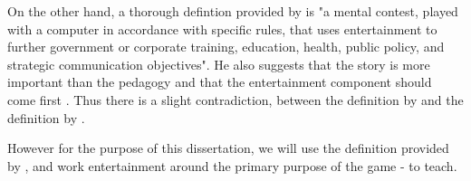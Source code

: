\documentclass[a4paper,11.5pt]{report}
\numberwithin{figure}{section}
\numberwithin{table}{section}
\numberwithin{equation}{section}
\numberwithin{equation}{section}
\begin{document}
On the other hand, a thorough defintion provided by \citeauthor{Zyda2005} is "a mental contest, played with a computer in accordance with specific rules, that uses entertainment to further government or corporate training, education, health, public policy, and strategic communication objectives". He also suggests that the story is more important than the pedagogy and that the entertainment component should come first \cite{Zyda2005}. Thus there is a slight contradiction, between the definition by \citeauthor{Zyda2005} and the definition by \citeauthor{Michael2005}.

However for the purpose of this dissertation, we will use the definition provided by \citeauthor{apt1970}, and work entertainment around the primary purpose of the game - to teach.













\end{document}
